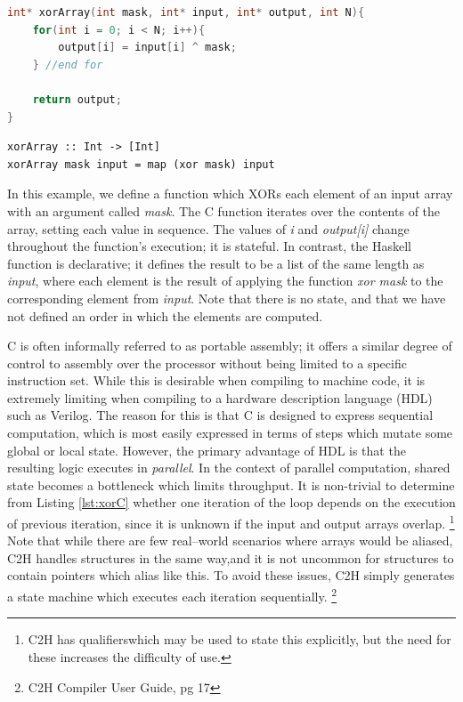 \documentclass[english,onecolumn]{article}
\begin{document}
\begin{lstlisting}[language=C, caption={XORing an array in C.}, label={lst:xorC}]
int* xorArray(int mask, int* input, int* output, int N){
    for(int i = 0; i < N; i++){
        output[i] = input[i] ^ mask;
    } //end for

    return output;
}
\end{lstlisting}

\begin{lstlisting}[caption={XORing an array in Haskell.}, label={lst:xorH}]
xorArray :: Int -> [Int]
xorArray mask input = map (xor mask) input
\end{lstlisting}

In this example, we define a function which XORs each element of an input array with an argument called \textit{mask}. The C function iterates over the contents of the array, setting each value in sequence. The values of \textit{i} and \textit{output[i]} change throughout the function's execution; it is stateful. In contrast, the Haskell function is declarative; it defines the result to be a list of the same length as \textit{input}, where each element is the result of applying the function \textit{xor mask} to the corresponding element from \textit{input}. Note that there is no state, and that we have not defined an order in which the elements are computed.

C is often informally referred to as portable assembly; it offers a similar degree of control to assembly over the processor without being limited to a specific instruction set. While this is desirable when compiling to machine code, it is extremely limiting when compiling to a hardware description language (HDL) such as Verilog.
The reason for this is that C is designed to express sequential computation, which is most easily expressed in terms of steps which mutate some global or local state. However, the primary advantage of HDL is that the resulting logic executes in \textit{parallel}. In the context of parallel computation, shared state becomes a bottleneck which limits throughput.
It is non-trivial to determine from Listing \ref{lst:xorC} whether one iteration of the loop depends on the execution of previous iteration, since it is unknown if the input and output arrays overlap.%
\footnote{C2H has qualifiers\footnotemark which may be used to state this explicitly, but the need for these increases the difficulty of use.}
Note that while there are few real--world scenarios where arrays would be aliased, C2H handles structures in the same way,\footnotemark and it is not uncommon for structures to contain pointers which alias like this.
To avoid these issues, C2H simply generates a state machine which executes each iteration sequentially.%
\footnote{C2H Compiler User Guide, pg 17}
\end{document}
